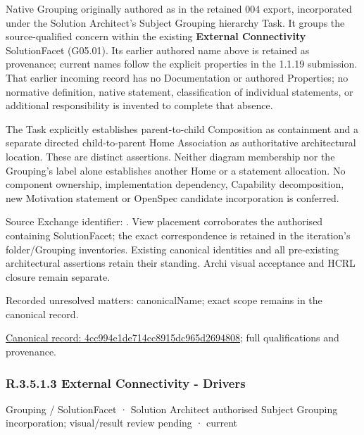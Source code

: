Native Grouping originally authored as \texttt{} in the retained 004 export,
incorporated under the Solution Architect's Subject Grouping hierarchy Task.
It groups the source-qualified \texttt{} concern within
the existing \textbf{External Connectivity} SolutionFacet (G05.01). Its earlier authored name above is retained as provenance; current names
follow the explicit properties in the 1.1.19 submission.
That earlier incoming record has no Documentation or authored Properties; no normative
definition, native statement, classification of individual statements, or
additional responsibility is invented to complete that absence.



The Task explicitly establishes parent-to-child Composition as containment and
a separate directed child-to-parent Home Association as authoritative architectural
location. These are distinct assertions. Neither diagram membership nor the
Grouping's label alone establishes another Home or a statement allocation.
No component ownership, implementation dependency, Capability decomposition,
new Motivation statement or OpenSpec candidate incorporation is conferred.



Source Exchange identifier: \texttt{}. View placement corroborates
the authorised containing SolutionFacet; the exact correspondence is retained in the
iteration's folder/Grouping inventories. Existing canonical identities and all
pre-existing architectural assertions retain their standing. Archi visual
acceptance and HCRL closure remain separate.


{\small Recorded unresolved matters: canonicalName; exact scope remains in the canonical record.}\par
{\footnotesize \href{../../../../../../../continuum/grouping/4cc994e1de714cc8915dc965d2694808.md}{Canonical record: 4cc994e1de714cc8915dc965d2694808}; full qualifications and provenance.}\par
\subsubsection*{R.3.5.1.3 External Connectivity - Drivers}
\label{navigation:R.3.5.1.3}

\label{element:3f830af6837d4f89bcd042039572bcdc}
{\small Grouping / SolutionFacet · Solution Architect authorised Subject Grouping incorporation; visual/result review pending · current}\par

